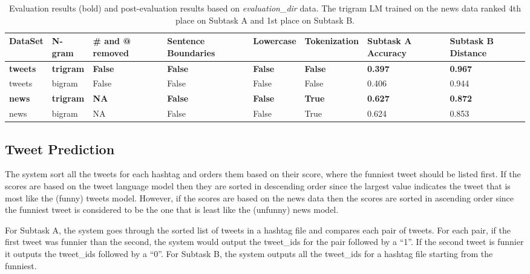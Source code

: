\documentclass[11pt,a4paper]{article}
\begin{document}
\begin{table*}[h!]
\centering
\begin{tabular}{ |p{1.2cm}|p{1.2cm}|p{1.2cm}|p{1.7cm}|p{1.5cm}|p{1.9cm}|p{1.7cm}|p{1.7cm}|}
\hline
DataSet & N-gram & \# and @ removed  & Sentence Boundaries & Lowercase & Tokenization & Subtask A Accuracy & Subtask B Distance \\
\hline
\textbf{tweets} & \textbf{trigram} & \textbf{False} & \textbf{False} & \textbf{False} & \textbf{False} & \textbf{0.397} & \textbf{0.967} \\
\hline
tweets & bigram & False & False & False & False & 0.406 & 0.944 \\
\hline
\textbf{news} & \textbf{trigram} & \textbf{NA} & \textbf{False} & \textbf{False} & \textbf{True} & \textbf{0.627} & \textbf{0.872} \\
\hline
news & bigram & NA & False & False & True & 0.624 & 0.853 \\
\hline
\end{tabular}
\caption{Evaluation results (bold) and post-evaluation results based on \textit{evaluation\_dir} data. The trigram LM trained on the news data ranked 4th place on Subtask A and 1st place on Subtask B.}
\label{table:3}
\end{table*}

\subsection{Tweet Prediction}

The system sort all the tweets for each hashtag and orders them based on their
score, where the funniest tweet should be listed first. If the scores are based
on the tweet language model then they are sorted in descending order since the
largest value indicates the tweet that is most like the (funny) tweets model. 
However,
if the scores are based on the news data then the scores are sorted in ascending
order since the funniest tweet is considered to be the one that is least like 
the (unfunny) news model.

For Subtask A, the system goes through the sorted list of tweets in a hashtag file
and compares each pair of tweets. For each pair, if the first tweet was funnier 
than the second, the system would output the tweet\_ids for the pair 
followed by a ``1''. If the second tweet is funnier it outputs the tweet\_ids 
followed by a ``0''. For Subtask B, the system outputs all the tweet\_ids for
a hashtag file starting from the funniest. 
\end{document}
